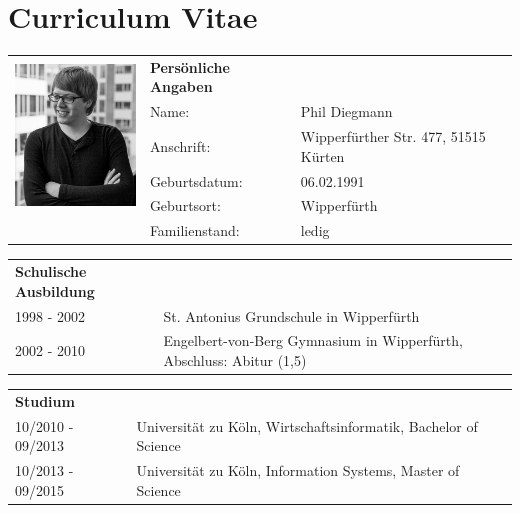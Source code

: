 \section*{\hspace{0.2cm}Curriculum Vitae} 

\begin{flushleft}

\begin{tabular}{p{11em} p{10em} p{10em}}
    \multirow{5}{*}{\includegraphics[width=40mm]{figures/passfoto.jpg}} & \textbf{Persönliche Angaben} & \addspace \\
    & Name: & Phil Diegmann \\
    & Anschrift: & Wipperfürther Str. 477, 51515 Kürten \\
    & Geburtsdatum: & 06.02.1991 \\
    & Geburtsort: & Wipperfürth \\
    & Familienstand: & ledig \\
\end{tabular}

\vspace{1.5em}

\begin{tabular}{p{11em} p{22.5em}}
    \textbf{Schulische Ausbildung} & \addspace \\
    1998 - 2002 & St. Antonius Grundschule in Wipperfürth \\
    2002 - 2010 & Engelbert-von-Berg Gymnasium in Wipperfürth, Abschluss: Abitur (1,5) \\
\end{tabular}

\vspace{0.5em}

\begin{tabular}{p{11em} p{22.5em}}
    \textbf{Studium} & \addspace \\
    10/2010 - 09/2013 & Universität zu Köln, Wirtschaftsinformatik, Bachelor of Science \\
    10/2013 - 09/2015 & Universität zu Köln, Information Systems, Master of Science
\end{tabular}


\vspace{-1em}



\end{flushleft}